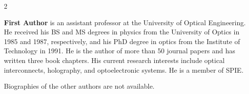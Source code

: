 \documentclass[12pt]{spieman}  %
\begin{document}
\begin{spacing}{2}



\vspace{2ex}\noindent\textbf{First Author} is an assistant professor at the University of Optical Engineering. He received his BS and MS degrees in physics from the University of Optics in 1985 and 1987, respectively, and his PhD degree in optics from the Institute of Technology in 1991.  He is the author of more than 50 journal papers and has written three book chapters. His current research interests include optical interconnects, holography, and optoelectronic systems. He is a member of SPIE.

\vspace{1ex}
\noindent Biographies of the other authors are not available.

\listoffigures
\listoftables

\end{spacing}
\end{document}
